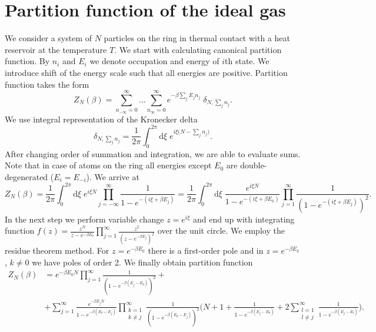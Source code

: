 \documentclass[aps,pra,reprint]{revtex4-2}
\begin{document}
\section{Partition function of the ideal gas}
We consider a system of $N$ particles on the ring in thermal contact with a 
heat reservoir at the temperature $T$. We start with calculating canonical 
partition function. By $n_i$ and $E_i$ we denote occupation and energy of 
$i$th state. We introduce shift of the energy scale such that all energies are 
positive. Partition function takes the form
\begin{equation}
Z_N(\beta) = \sum_{n_{-\infty}=0}^{\infty} \ldots \sum_{n_{\infty}=0}^{\infty} 
e^{-\beta \sum_j E_j n_j} \; \delta_{N, \sum_j n_j}.
\end{equation}
We use  integral representation of the Kronecker delta
\begin{equation}
\delta_{N, \sum_j n_j} = \frac{1}{2 \pi} \int_0^{2 \pi} \mathrm{d} \xi \; 
e^{i \xi \big(N-\sum_j n_j\big)}.
\end{equation}
After changing order of summation and integration, we are able to evaluate 
sums. Note that in case of atoms on the ring all energies except $E_0$ are 
double-degenerated ($E_i=E_{-i}$). We arrive at
\begin{equation}
Z_N(\beta) = \frac{1}{2 \pi} \int_0^{2 \pi} \mathrm{d} \xi \; e^{i \xi N} 
\prod_{j=-\infty}^{\infty} \frac{1}{1-e^{-(i \xi+\beta E_j)}} = \frac{1}{2 \pi} 
\int_0^{2 \pi} \mathrm{d} \xi \; \frac{e^{i \xi N}}{1-e^{-(i \xi+\beta E_0)}} 
\prod_{j=1}^{\infty} \frac{1}{(1-e^{-(i \xi+\beta E_j)})^2}.
\end{equation}
In the next step we perform variable change $z=e^{i \xi}$ and end up with 
integrating function $f(z)=\frac{z^N}{z-e^{-\beta E_0}} \prod_{j=1}^{\infty} 
\frac{z^2}{(z-e^{-\beta E_j})^2}$ over the unit circle. We employ the residue 
theorem method. For $z=e^{-\beta E_0}$ there is a first-order pole and in 
$z=e^{-\beta E_k}$, $k \neq 0$ we have poles of order 2. We finally obtain 
partition function 
\begin{equation}
\label{eq:pfexact}
\begin{split}
Z_N(\beta) &= e^{-\beta E_0 N} \prod_{j=1}^{\infty} 
\frac{1}{(1-e^{-\beta (E_j-E_0)})^2} + \\ 
&+ \sum_{j=1}^{\infty} \frac{e^{-\beta E_j N}}{1-e^{-\beta (E_0-E_j)}} 
\prod_{\substack{k=1 \\ k \neq j}}^{\infty} 
\frac{1}{(1-e^{-\beta (E_k-E_j)})^2} \Bigg(N + 1 + 
\frac{1}{1-e^{-\beta (E_j-E_0)}} + 2\sum_{\substack{l=1 \\ l \neq j}}^{\infty} 
\frac{1}{1-e^{-\beta (E_j-E_l)}} \Bigg).
\end{split}
\end{equation}
\end{document}
